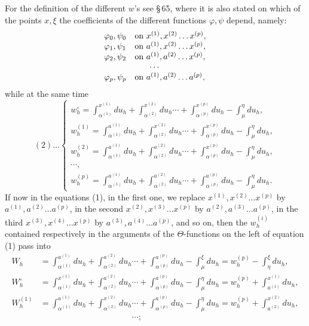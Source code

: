 \documentclass[10pt]{article}
\begin{document}
For the definition of the different \(w\)'s see \S\,65, where it is also stated on which of the points \(x,\xi\) the coefficients of the different functions \(\varphi,\psi\) depend, namely:
\[
\begin{array}{ll}
\varphi_0,\psi_0 & \text{on }x^{(1)},x^{(2)}\ldots x^{(p)},\\
\varphi_1,\psi_1 & \text{on }a^{(1)},x^{(2)}\ldots x^{(p)},\\
\varphi_2,\psi_2 & \text{on }a^{(1)},a^{(2)}\ldots x^{(p)},\\
\multicolumn{2}{c}{\cdots}\\
\varphi_p,\psi_p & \text{on }a^{(1)},a^{(2)}\ldots a^{(p)},
\end{array}
\]
while at the same time
\[
(2)\ldots
\begin{cases}
w_h^\circ=\displaystyle\int_{\alpha^{(1)}}^{x^{(1)}}du_h+\int_{\alpha^{(2)}}^{x^{(2)}}du_h\cdots+\int_{\alpha^{(p)}}^{x^{(p)}}du_h-\int_{\mu}^{\eta}du_h,\\[0.55em]
w_h^{(1)}=\displaystyle\int_{\alpha^{(1)}}^{a^{(1)}}du_h+\int_{\alpha^{(2)}}^{x^{(2)}}du_h\cdots+\int_{\alpha^{(p)}}^{x^{(p)}}du_h-\int_{\mu}^{\eta}du_h,\\[0.55em]
w_h^{(2)}=\displaystyle\int_{\alpha^{(1)}}^{a^{(1)}}du_h+\int_{\alpha^{(2)}}^{a^{(2)}}du_h\cdots+\int_{\alpha^{(p)}}^{x^{(p)}}du_h-\int_{\mu}^{\eta}du_h,\\
\cdots,\\
w_h^{(p)}=\displaystyle\int_{\alpha^{(1)}}^{a^{(1)}}du_h+\int_{\alpha^{(2)}}^{a^{(2)}}du_h\cdots+\int_{\alpha^{(p)}}^{a^{(p)}}du_h-\int_{\mu}^{\eta}du_h.
\end{cases}
\]
If now in the equations (1), in the first one, we replace \(x^{(1)},x^{(2)}\ldots x^{(p)}\) by \(a^{(1)},a^{(2)}\ldots a^{(p)}\), in the second \(x^{(2)},x^{(3)}\ldots x^{(p)}\) by \(a^{(2)},a^{(3)}\ldots a^{(p)}\), in the third \(x^{(3)},x^{(4)}\ldots x^{(p)}\) by \(a^{(3)},a^{(4)}\ldots a^{(p)}\), and so on, then the \(w_h^{(i)}\) contained respectively in the arguments of the \(\Theta\)-functions on the left of equation (1) pass into
\[
\begin{aligned}
W_h&=\int_{\alpha^{(1)}}^{a^{(1)}}du_h+\int_{\alpha^{(2)}}^{a^{(2)}}du_h\cdots+\int_{\alpha^{(p)}}^{a^{(p)}}du_h-\int_{\mu}^{\xi}du_h
=w_h^{(p)}-\int_{\eta}^{\xi}du_h,\\
W_h^\circ&=\int_{\alpha^{(1)}}^{x^{(1)}}du_h+\int_{\alpha^{(2)}}^{a^{(2)}}du_h\cdots+\int_{\alpha^{(p)}}^{a^{(p)}}du_h-\int_{\mu}^{\eta}du_h
=w_h^{(p)}+\int_{a^{(1)}}^{x^{(1)}}du_h,\\
W_h^{(1)}&=\int_{\alpha^{(1)}}^{a^{(1)}}du_h+\int_{\alpha^{(2)}}^{x^{(2)}}du_h\cdots+\int_{\alpha^{(p)}}^{a^{(p)}}du_h-\int_{\mu}^{\eta}du_h
=w_h^{(p)}+\int_{a^{(2)}}^{x^{(2)}}du_h,\\
&\hspace{11em}\cdots;
\end{aligned}
\]
\end{document}
